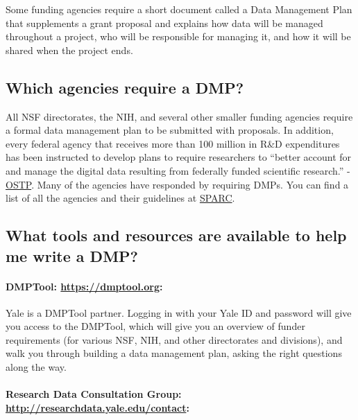 Some funding agencies require a short document called a Data Management
Plan that supplements a grant proposal and explains how data will be
managed throughout a project, who will be responsible for managing it,
and how it will be shared when the project ends.

\subsection{Which agencies require a
DMP?}\label{which-agencies-require-a-dmp}

All NSF directorates, the NIH, and several other smaller funding
agencies require a formal data management plan to be submitted with
proposals. In addition, every federal agency that receives more than 100
million in R\&D expenditures has been instructed to develop plans to
require researchers to ``better account for and manage the digital data
resulting from federally funded scientific research.'' -
\href{https://www.whitehouse.gov/blog/2013/02/22/expanding-public-access-results-federally-funded-research}{OSTP}.
Many of the agencies have responded by requiring DMPs. You can find a
list of all the agencies and their guidelines at
\href{http://datasharing.sparcopen.org}{SPARC}.

\subsection{What tools and resources are available to help me write a
DMP?}\label{what-tools-and-resources-are-available-to-help-me-write-a-dmp}

\paragraph{\texorpdfstring{DMPTool:
\href{https://dmptool.org/}{https://dmptool.org}:}{DMPTool: https://dmptool.org:}}\label{dmptool-httpsdmptool.org}

Yale is a DMPTool partner. Logging in with your Yale ID and password
will give you access to the DMPTool, which will give you an overview of
funder requirements (for various NSF, NIH, and other directorates and
divisions), and walk you through building a data management plan, asking
the right questions along the way.

\paragraph{\texorpdfstring{Research Data Consultation Group:
\url{http://researchdata.yale.edu/contact}:}{Research Data Consultation Group: http://researchdata.yale.edu/contact:}}\label{research-data-consultation-group-httpresearchdata.yale.educontact}

